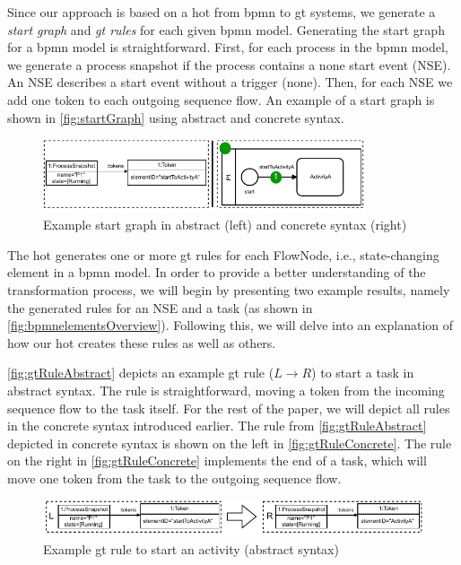 \documentclass[runningheads]{llncs}
\begin{document}
Since our approach is based on a \gls*{hot} from \gls*{bpmn} to \gls*{gt} systems, we generate a \textit{start graph} and \textit{\gls*{gt} rules} for each given \gls*{bpmn} model.
Generating the start graph for a \gls*{bpmn} model is straightforward.
First, for each process in the \gls*{bpmn} model, we generate a process snapshot if the process contains a none start event (NSE).
An NSE describes a start event without a trigger (none).
Then, for each NSE we add one token to each outgoing sequence flow.
An example of a start graph is shown in \autoref{fig:startGraph} using abstract and concrete syntax.

\begin{figure}[ht]
    \centering
    \includegraphics[width=0.85\textwidth]{images/startGraph.pdf}
    \caption{Example start graph in abstract (left) and concrete syntax (right)}
    \label{fig:startGraph}
\end{figure}

The \gls*{hot} generates one or more \gls*{gt} rules for each \textsf{FlowNode}, i.e., state-changing element in a \gls*{bpmn} model.
In order to provide a better understanding of the transformation process, we will begin by presenting two example results, namely the generated rules for an NSE and a task (as shown in \autoref{fig:bpmnelementsOverview}).
Following this, we will delve into an explanation of how our \gls*{hot} creates these rules as well as others.

\autoref{fig:gtRuleAbstract} depicts an example \gls*{gt} rule ($L \to R$) to start a task in abstract syntax.
The rule is straightforward, moving a token from the incoming sequence flow to the task itself.
For the rest of the paper, we will depict all rules in the concrete syntax introduced earlier.
The rule from \autoref{fig:gtRuleAbstract} depicted in concrete syntax is shown on the left in \autoref{fig:gtRuleConcrete}.
The rule on the right in \autoref{fig:gtRuleConcrete} implements the end of a task, which will move one token from the task to the outgoing sequence flow.

\begin{figure}[ht]
    \centering
  \includegraphics[width=1\textwidth]{images/rule_abstract.pdf}
  \caption{Example \gls*{gt} rule to start an activity (abstract syntax)}  \label{fig:gtRuleAbstract}
\end{figure}
\end{document}
